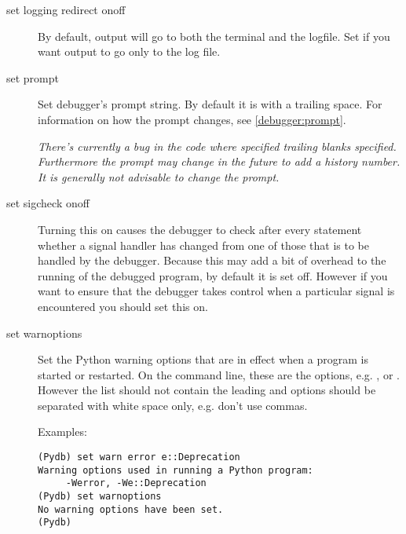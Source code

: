 \begin{description}
\item[set logging redirect on\code{\Large{|}}off]\label{command:log-redirect}

By default,  output will go to both the terminal and the
logfile.  Set  if you want output to go only to the log
file.

\item[set prompt ]\label{command:prompt}

Set debugger's prompt string. By default it is  with
a trailing space. For information on how the prompt
changes, see \ref{debugger:prompt}.

\emph{There's currently a bug in the code where specified trailing
blanks specified. Furthermore the prompt may change in the future to
add a history number. It is generally not advisable to change the
prompt.}

\item[set sigcheck on\code{\Large{|}}off]\label{command:sigwatch}

Turning this on causes the debugger to check after every statement
whether a signal handler has changed from one of those that is to be
handled by the debugger. Because this may add a bit of overhead to the
running of the debugged program, by default it is set off. However if
you want to ensure that the debugger takes control when a particular
signal is encountered you should set this on.

%

\item[set warnoptions ]

Set the Python warning options that are in effect when a program is started
or restarted. On the command line, these are the  options,
e.g. , or . However the list
should not contain the leading  and options should be
separated with white space only, e.g. don't use commas. 

Examples:
\begin{verbatim}
(Pydb) set warn error e::Deprecation
Warning options used in running a Python program:
	 -Werror, -We::Deprecation
(Pydb) set warnoptions
No warning options have been set.
(Pydb) 
\end{verbatim}

\end{description}

